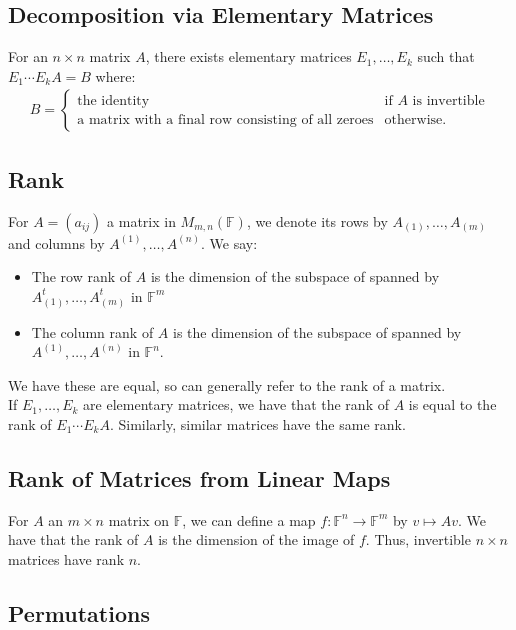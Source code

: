 \documentclass[a4paper, 12pt, twoside]{article}
\begin{document}
\subsection{Decomposition via Elementary Matrices}

For an $n \times n$ matrix $A$, there exists elementary matrices
$E_1, \ldots, E_k$ such that $E_1\cdots E_kA = B$ where:
\begin{gather*}
  B = \begin{cases}
    \text{the identity} & \text{if $A$ is invertible} \\
    \text{a matrix with a final row consisting of all zeroes} & \text{otherwise.}
  \end{cases}
\end{gather*}

\subsection{Rank}

For $A = (a_{ij})$ a matrix in $M_{m,n}(\mathbb{F})$, we denote its rows by
$A_{(1)}, \ldots, A_{(m)}$ and columns by $A^{(1)}, \ldots, A^{(n)}$. We
say: \begin{itemize}
  \item The row rank of $A$ is the dimension of the subspace of spanned by 
  $A_{(1)}^t, \ldots, A_{(m)}^t$ in $\mathbb{F}^m$
  \item The column rank of $A$ is the dimension of the subspace of spanned by 
  \newline $A^{(1)}, \ldots, A^{(n)}$ in $\mathbb{F}^n$.
\end{itemize} We have these are equal, so can generally refer to the rank 
of a matrix.
\\[\baselineskip]
If $E_1, \ldots, E_k$ are elementary matrices, we have that the rank of $A$
is equal to the rank of $E_1\cdots E_kA$. Similarly, similar matrices have
the same rank.

\subsection{Rank of Matrices from Linear Maps}

For $A$ an $m \times n$ matrix on $\mathbb{F}$, we can define a map 
$f : \mathbb{F}^n \to \mathbb{F}^m$ by $v \mapsto Av$. We have that
the rank of $A$ is the dimension of the image of $f$.
Thus, invertible $n \times n$ matrices have rank $n$.

\subsection{Permutations}
\end{document}

